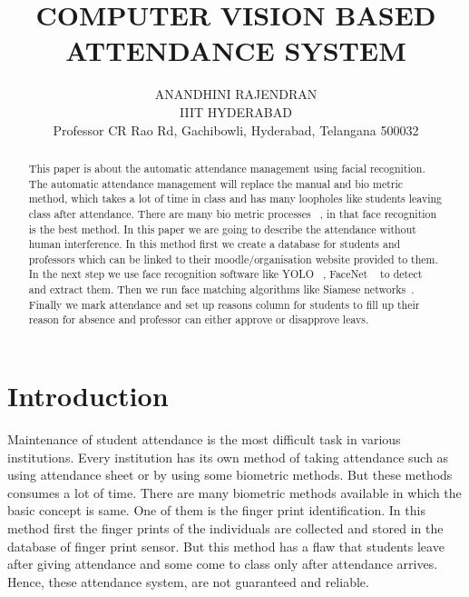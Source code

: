 \documentclass[10pt,twocolumn,letterpaper]{article}
\begin{document}
\title{COMPUTER VISION BASED ATTENDANCE SYSTEM}

\author{ANANDHINI RAJENDRAN\\
IIIT HYDERABAD\\
Professor CR Rao Rd, Gachibowli, Hyderabad, Telangana 500032\\
}

\maketitle

\begin{abstract}
    This paper is about the automatic attendance management using facial recognition. The automatic attendance management will replace the manual and bio metric method, which takes a lot of time in class and has many loopholes like students leaving class after attendance. There are many bio metric processes ~\cite{biometric}, in that face recognition is the best method. In this paper we are going to describe the attendance without human interference. In this method first we create a database for students and professors which can be linked to their moodle/organisation website provided to them. In the next step we use face recognition software like YOLO ~\cite{yolo}, FaceNet ~\cite{facenet1} to detect and extract them. Then we run face matching algorithms like Siamese networks~\cite{face-detect}. Finally we mark attendance and set up reasons column for students to fill up their reason for absence and professor can either approve or disapprove leavs.
\end{abstract}

\section{Introduction}

Maintenance of student attendance is the most difficult task in various institutions. Every institution has its own method of taking attendance such as using attendance sheet or by using some biometric methods. But these methods consumes a lot of time. There are many biometric methods available in which the basic concept is same. One of them is the finger print identification. In this method first the finger prints of the individuals are collected and stored in the database of finger print sensor. But this method has a flaw that students leave after giving attendance and some come to class only after attendance arrives. Hence, these attendance system, are not guaranteed and reliable.
\end{document}
